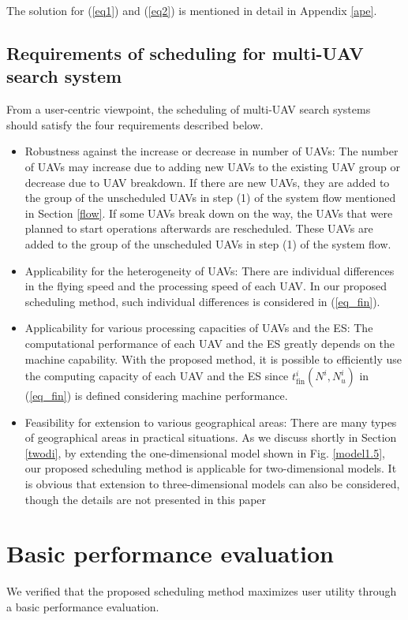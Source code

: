 \documentclass{ieeeaccess}
\begin{document}
The solution for (\ref{eq1}) and (\ref{eq2}) is mentioned in detail in Appendix \ref{ape}.

\subsection{Requirements of scheduling for multi-UAV search system} \label{feature}
From a user-centric viewpoint, the scheduling of multi-UAV search systems should satisfy the four requirements described below.
\begin{itemize}
\item Robustness against the increase or decrease in number of UAVs: The number of UAVs may increase due to adding new UAVs to the existing UAV group or decrease due to UAV breakdown. If there are new UAVs, they are added to the group of the unscheduled UAVs in step (1) of the system flow mentioned in Section \ref{flow}. If some UAVs break down on the way, the UAVs that were planned to start operations afterwards are rescheduled. These UAVs are added to the group of the unscheduled UAVs in step (1) of the system flow.
%
\item Applicability for the heterogeneity of UAVs: 
There are individual differences in the flying speed and the processing speed of each UAV. 
In our proposed scheduling method, such individual differences is considered in (\ref{eq_fin}).
%
\item Applicability for various processing capacities of UAVs and the ES: The computational performance of each UAV and the ES greatly depends on the machine capability. With the proposed method, it is possible to efficiently use the computing capacity of each UAV and the ES since $t_{\mathrm{fin}}^i(N^i,N_u^i)$ in (\ref{eq_fin}) is defined considering machine performance.
%
\item Feasibility for extension to various geographical areas: There are many types of geographical areas in practical situations. As we discuss shortly in Section \ref{twodi}, by extending the one-dimensional model shown in Fig. \ref{model1.5}, our proposed scheduling method is applicable for two-dimensional models. It is obvious that extension to three-dimensional models can also be considered, though the details are not presented in this paper
\end{itemize}

\section{Basic performance evaluation}\label{eva}
We verified that the proposed scheduling method maximizes user utility through a basic performance evaluation.
\end{document}
